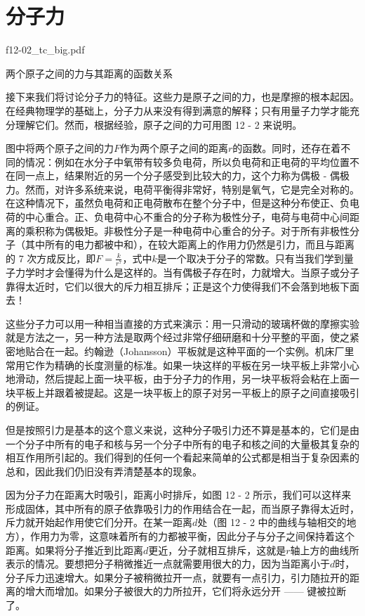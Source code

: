 \documentclass[12pt,oneside]{book}
\begin{document}
\section{分子力}
\begin{fig}{f12-02_tc_big.pdf}
\caption{两个原子之间的力与其距离的函数关系}
\label{fig:12-2}
\end{fig}


接下来我们将讨论分子力的特征。这些力是原子之间的力，也是摩擦的根本起因。在经典物理学的基础上，分子力从来没有得到满意的解释；只有用量子力学才能充分理解它们。然而，根据经验，原子之间的力可用图 12 - 2 来说明。



图中将两个原子之间的力$F$作为两个原子之间的距离$r$的函数。同时，还存在着不同的情况：例如在水分子中氧带有较多负电荷，所以负电荷和正电荷的平均位置不在同一点上，结果附近的另一个分子感受到比较大的力，这个力称为偶极 - 偶极力。然而，对许多系统来说，电荷平衡得非常好，特别是氧气，它是完全对称的。在这种情况下，虽然负电荷和正电荷散布在整个分子中，但是这种分布使正、负电荷的中心重合。正、负电荷中心不重合的分子称为极性分子，电荷与电荷中心间距离的乘积称为偶极矩。非极性分子是一种电荷中心重合的分子。对于所有非极性分子（其中所有的电力都被中和），在较大距离上的作用力仍然是引力，而且与距离的 7 次方成反比，即$F = \frac{k}{r^{7}}$，式中$k$是一个取决于分子的常数。只有当我们学到量子力学时才会懂得为什么是这样的。当有偶极子存在时，力就增大。当原子或分子靠得太近时，它们以很大的斥力相互排斥；正是这个力使得我们不会落到地板下面去！


这些分子力可以用一种相当直接的方式来演示：用一只滑动的玻璃杯做的摩擦实验就是方法之一，另一种方法是取两个经过非常仔细研磨和十分平整的平面，使之紧密地贴合在一起。约翰逊（Johansson）平板就是这种平面的一个实例。机床厂里常用它作为精确的长度测量的标准。如果一块这样的平板在另一块平板上非常小心地滑动，然后提起上面一块平板，由于分子力的作用，另一块平板将会粘在上面一块平板上并跟着被提起。这是一块平板上的原子对另一平板上的原子之间直接吸引的例证。


但是按照引力是基本的这个意义来说，这种分子吸引力还不算是基本的，它们是由一个分子中所有的电子和核与另一个分子中所有的电子和核之间的大量极其复杂的相互作用所引起的。我们得到的任何一个看起来简单的公式都是相当于复杂因素的总和，因此我们仍旧没有弄清楚基本的现象。


因为分子力在距离大时吸引，距离小时排斥，如图 12 - 2 所示，我们可以这样来形成固体，其中所有的原子依靠吸引力的作用结合在一起，而当原子靠得太近时，斥力就开始起作用使它们分开。在某一距离$d$处（图 12 - 2 中的曲线与轴相交的地方），作用力为零，这意味着所有的力都被平衡，因此分子与分子之间保持着这个距离。如果将分子推近到比距离$d$更近，分子就相互排斥，这就是$r$轴上方的曲线所表示的情况。要想把分子稍微推近一点就需要用很大的力，因为当距离小于$d$时，分子斥力迅速增大。如果分子被稍微拉开一点，就要有一点引力，引力随拉开的距离的增大而增加。如果分子被很大的力所拉开，它们将永远分开 —— 键被拉断了。
\end{document}
